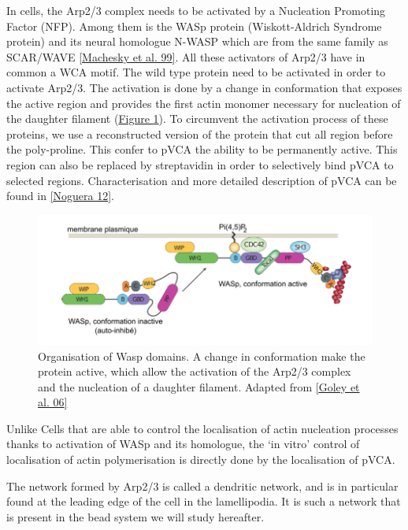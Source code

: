 \documentclass[A4paperpaper,11pt,english]{sphinxmanual}
\begin{document}
In cells, the Arp2/3 complex needs to be activated by a Nucleation Promoting
Factor (NFP).  Among them is the  WASp protein (Wiskott-Aldrich Syndrome
protein) and its neural homologue N-WASP which are from the same family as
SCAR/WAVE {\hyperref[parts/part1:machesky1999]{{[}Machesky et al. 99{]}}}.  All these activators of Arp2/3 have in common a
WCA motif. The wild type protein need to be activated in order to activate Arp2/3.
The activation is done by a change in conformation that exposes the active
region and provides the first actin monomer necessary for nucleation of the
daughter filament (\hyperref[parts/part1:fig-pwa-deploy]{Figure  \ref*{parts/part1:fig-pwa-deploy}}).  To circumvent the activation process of
these proteins, we use a reconstructed version of the protein that cut all
region before the poly-proline. This confer to pVCA the ability to be
permanently active. This region can also be replaced by streptavidin in order
to selectively bind pVCA to selected regions. Characterisation and more
detailed description of pVCA can be found in {\hyperref[parts/part1:noguera2012]{{[}Noguera 12{]}}}.
\begin{figure}[htbp]
\centering
\capstart

\includegraphics[width=0.600\linewidth]{pwa-deploy.png}
\caption{Organisation of Wasp domains. A change in conformation make the protein
active, which allow the activation of the Arp2/3 complex and the nucleation
of a daughter filament.  Adapted from {\hyperref[parts/part1:goley2006]{{[}Goley et al. 06{]}}}}\label{parts/part1:fig-pwa-deploy}\end{figure}

Unlike Cells that are able to control the localisation of actin nucleation
processes thanks to activation of WASp and its homologue, the `in vitro' control
of localisation of actin polymerisation is directly done by the localisation of
pVCA.

The network formed by Arp2/3 is called a dendritic network, and is in
particular found at the leading edge of the cell in the lamellipodia. It is
such a network that is present in the bead system we will study hereafter.
\end{document}

